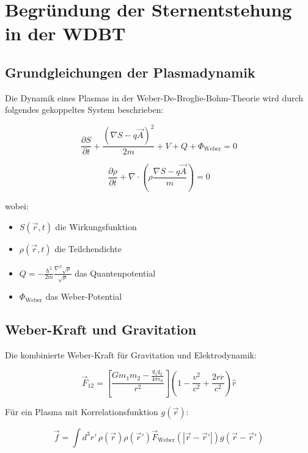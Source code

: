 \chapter{Begründung der Sternentstehung in der WDBT}
\label{app:sternentstehung}

\section{Grundgleichungen der Plasmadynamik}
Die Dynamik eines Plasmas in der Weber-De-Broglie-Bohm-Theorie wird durch folgendes gekoppeltes System beschrieben:

\begin{equation}
\frac{\partial S}{\partial t} + \frac{(\nabla S - q\vec{A})^2}{2m} + V + Q + \Phi_{\text{Weber}} = 0
\end{equation}

\begin{equation}
\frac{\partial \rho}{\partial t} + \nabla \cdot \left(\rho \frac{\nabla S - q\vec{A}}{m}\right) = 0
\end{equation}

wobei:
\begin{itemize}
\item $S(\vec{r},t)$ die Wirkungsfunktion
\item $\rho(\vec{r},t)$ die Teilchendichte
\item $Q = -\frac{\hbar^2}{2m}\frac{\nabla^2 \sqrt{\rho}}{\sqrt{\rho}}$ das Quantenpotential
\item $\Phi_{\text{Weber}}$ das Weber-Potential
\end{itemize}

\section{Weber-Kraft und Gravitation}
Die kombinierte Weber-Kraft für Gravitation und Elektrodynamik:

\begin{equation}
\vec{F}_{12} = \left[\frac{Gm_1m_2 - \frac{q_1q_2}{4\pi\epsilon_0}}{r^2}\right]\left(1 - \frac{v^2}{c^2} + \frac{2r\ddot{r}}{c^2}\right)\hat{r}
\end{equation}

Für ein Plasma mit Korrelationsfunktion $g(\vec{r})$:

\begin{equation}
\vec{f} = \int d^3r'\, \rho(\vec{r})\rho(\vec{r}')\vec{F}_{\text{Weber}}(|\vec{r}-\vec{r}'|)g(\vec{r}-\vec{r}')
\end{equation}

